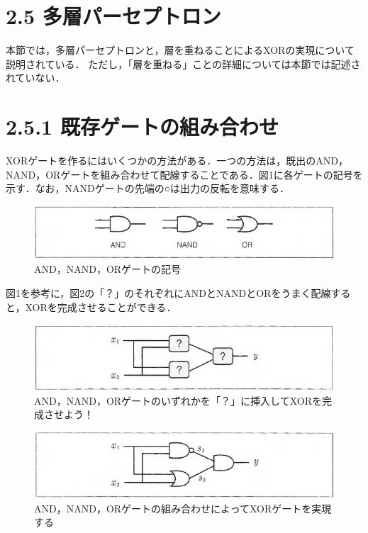 \documentclass[dvipdfmx]{jsarticle}
\begin{document}
\section*{2.5 多層パーセプトロン}
本節では，多層パーセプトロンと，層を重ねることによるXORの実現について説明されている．
ただし，「層を重ねる」ことの詳細については本節では記述されていない．

\section*{2.5.1 既存ゲートの組み合わせ}
XORゲートを作るにはいくつかの方法がある．一つの方法は，既出のAND，NAND，ORゲートを組み合わせて配線することである．図1に各ゲートの記号を示す．なお，NANDゲートの先端の○は出力の反転を意味する．


\begin{figure}[htbp]
    \begin{center}
        \includegraphics[width=\linewidth]{spring_lec/dp_gate.png}
    \end{center}
    \caption{AND，NAND，ORゲートの記号}
\end{figure}

図1を参考に，図2の「？」のそれぞれにANDとNANDとORをうまく配線すると，XORを完成させることができる．

\begin{figure}[htbp]
\begin{center}
\includegraphics[width=\linewidth]{spring_lec/dp_xor.png}
\end{center}
\caption{AND，NAND，ORゲートのいずれかを「？」に挿入してXORを完成させよう！}
\end{figure}

\begin{figure}[htbp]
\begin{center}
\includegraphics[width=\linewidth]{spring_lec/dp_xor2.png}
\end{center}
\caption{AND，NAND，ORゲートの組み合わせによってXORゲートを実現する}
\end{figure}
\end{document}
